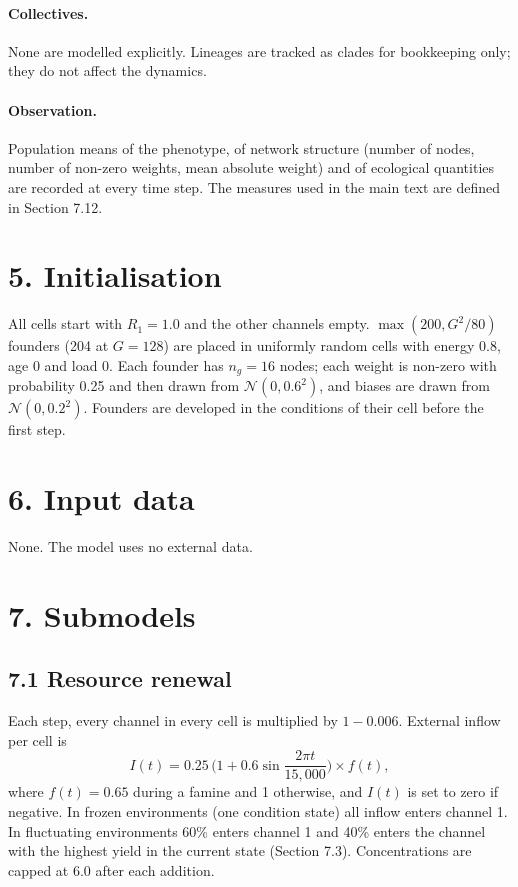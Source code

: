 \paragraph*{Collectives.} None are modelled explicitly. Lineages are tracked as
clades for bookkeeping only; they do not affect the dynamics.
\paragraph*{Observation.} Population means of the phenotype, of network structure
(number of nodes, number of non-zero weights, mean absolute weight) and of
ecological quantities are recorded at every time step. The measures used in the
main text are defined in Section 7.12.

\section*{5. Initialisation}
All cells start with $R_1=1.0$ and the other channels empty. $\max(200, G^2/80)$
founders (204 at $G=128$) are placed in uniformly random cells with energy 0.8,
age 0 and load 0. Each founder has $n_g=16$ nodes; each weight is non-zero with
probability 0.25 and then drawn from $\mathcal{N}(0,0.6^2)$, and biases are drawn
from $\mathcal{N}(0,0.2^2)$. Founders are developed in the conditions of their
cell before the first step.

\section*{6. Input data}
None. The model uses no external data.

\section*{7. Submodels}

\subsection*{7.1 Resource renewal}
Each step, every channel in every cell is multiplied by $1-0.006$. External inflow
per cell is
\begin{equation*}
I(t) = 0.25\,\Big(1 + 0.6\sin\frac{2\pi t}{15{,}000}\Big)\times f(t),
\end{equation*}
where $f(t)=0.65$ during a famine and 1 otherwise, and $I(t)$ is set to zero if
negative. In frozen environments (one condition state) all inflow enters channel
1. In fluctuating environments 60\% enters channel 1 and 40\% enters the channel
with the highest yield in the current state (Section 7.3). Concentrations are
capped at 6.0 after each addition.


